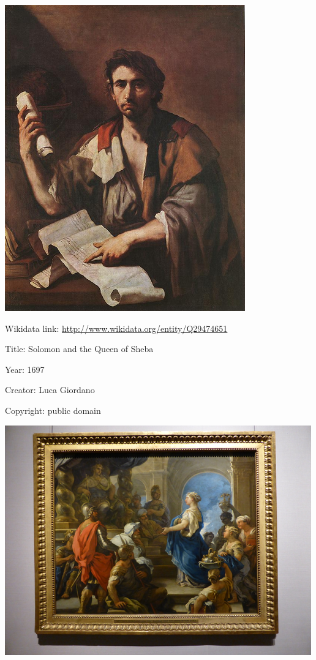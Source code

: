 \documentclass[
  letterpaper,
]{book}
\begin{document}
\includegraphics{./paintings_files/figure-pdf/cell-2-output-4.png}

Wikidata link: \url{http://www.wikidata.org/entity/Q29474651}

Title: Solomon and the Queen of Sheba

Year: 1697

Creator: Luca Giordano

Copyright: public domain

\includegraphics{./paintings_files/figure-pdf/cell-2-output-6.png}
\end{document}
